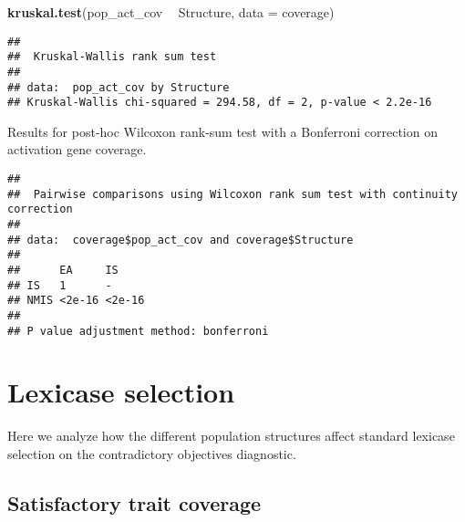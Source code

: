 \documentclass[]{book}
\newenvironment{Shaded}{\begin{snugshade}}{\end{snugshade}}
\newcommand{\DataTypeTok}[1]{\textcolor[rgb]{0.13,0.29,0.53}{#1}}
\newcommand{\KeywordTok}[1]{\textcolor[rgb]{0.13,0.29,0.53}{\textbf{#1}}}
\newcommand{\NormalTok}[1]{#1}
\newcommand{\OperatorTok}[1]{\textcolor[rgb]{0.81,0.36,0.00}{\textbf{#1}}}
\newcommand{\OtherTok}[1]{\textcolor[rgb]{0.56,0.35,0.01}{#1}}
\newcommand{\StringTok}[1]{\textcolor[rgb]{0.31,0.60,0.02}{#1}}
\begin{document}
\begin{Shaded}
\begin{Highlighting}[]
\KeywordTok{kruskal.test}\NormalTok{(pop_act_cov }\OperatorTok{~}\StringTok{ }\NormalTok{Structure, }\DataTypeTok{data =}\NormalTok{ coverage)}
\end{Highlighting}
\end{Shaded}

\begin{verbatim}
## 
##  Kruskal-Wallis rank sum test
## 
## data:  pop_act_cov by Structure
## Kruskal-Wallis chi-squared = 294.58, df = 2, p-value < 2.2e-16
\end{verbatim}

Results for post-hoc Wilcoxon rank-sum test with a Bonferroni correction on activation gene coverage.

\begin{Shaded}
\end{Shaded}

\begin{verbatim}
## 
##  Pairwise comparisons using Wilcoxon rank sum test with continuity correction 
## 
## data:  coverage$pop_act_cov and coverage$Structure 
## 
##      EA     IS    
## IS   1      -     
## NMIS <2e-16 <2e-16
## 
## P value adjustment method: bonferroni
\end{verbatim}

\hypertarget{lexicase-selection-10}{%
\section{Lexicase selection}\label{lexicase-selection-10}}

Here we analyze how the different population structures affect standard lexicase selection on the contradictory objectives diagnostic.

\hypertarget{satisfactory-trait-coverage-8}{%
\subsection{Satisfactory trait coverage}\label{satisfactory-trait-coverage-8}}
\end{document}
